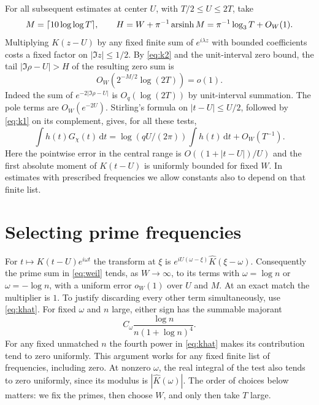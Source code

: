 \documentclass[11pt]{article}
\newcommand{\dd}{\,\mathrm d}
\newcommand{\lthree}{\log_3 T}
\newcommand{\wh}{\widehat}
\begin{document}
For all subsequent estimates at center $U$, with $T/2\le U\le2T$, take
\[
 M=\lceil 10\log\log T\rceil,\qquad
 H=W+\pi^{-1}\arsinh M=\pi^{-1}\lthree+O_W(1).
\]
Multiplying
$K(z-U)$ by any fixed finite sum of $e^{i\lambda z}$ with bounded
coefficients costs a fixed factor on $|\Im z|\le1/2$. By
\eqref{eq:k2} and the unit-interval zero bound, the tail
$|\Im\rho-U|>H$ of the resulting zero sum is
\begin{equation}
  O_W\!\left(2^{-M/2}\log(2T)\right)=o(1).
 \label{eq:tail}
\end{equation}
Indeed the sum of $e^{-2|\Im\rho-U|}$ is $O_q(\log(2T))$ by
unit-interval summation. The pole terms are $O_W(e^{-2U})$.
Stirling's formula on $|t-U|\le U/2$, followed by \eqref{eq:k1} on
its complement, gives, for all these tests,
\begin{equation}
 \int h(t)G_\chi(t)\dd t =
     \log(qU/(2\pi))\int h(t)\dd t+O_W(T^{-1}).
 \label{eq:gamma}
\end{equation}
Here the pointwise error in the central range is
$O((1+|t-U|)/U)$ and the first absolute moment of $K(t-U)$ is uniformly
bounded for fixed $W$. In estimates with prescribed frequencies we allow
constants also to depend on that finite list.

\section{Selecting prime frequencies}

For $t\mapsto K(t-U)e^{i\omega t}$ the transform at $\xi$ is
$e^{iU(\omega-\xi)}\wh K(\xi-\omega)$. Consequently the prime sum in
\eqref{eq:weil} tends, as $W\to\infty$, to its terms with
$\omega=\log n$ or $\omega=-\log n$, with a uniform error $o_W(1)$
over $U$ and $M$. At an exact match the multiplier is $1$. To justify
discarding every other term simultaneously, use \eqref{eq:khat}. For fixed
$\omega$ and $n$ large, either sign has the summable majorant
\[
 C_\omega\frac{\log n}{n(1+\log n)^4}.
\]
For any fixed unmatched $n$ the fourth power in \eqref{eq:khat} makes its
contribution tend to zero uniformly. This argument works for any fixed finite
list of frequencies, including zero. At nonzero $\omega$, the real integral
of the test also tends to zero uniformly, since its modulus is
$|\wh K(\omega)|$. The order of choices below matters: we fix the primes,
then choose $W$, and only then take $T$ large.
\end{document}

